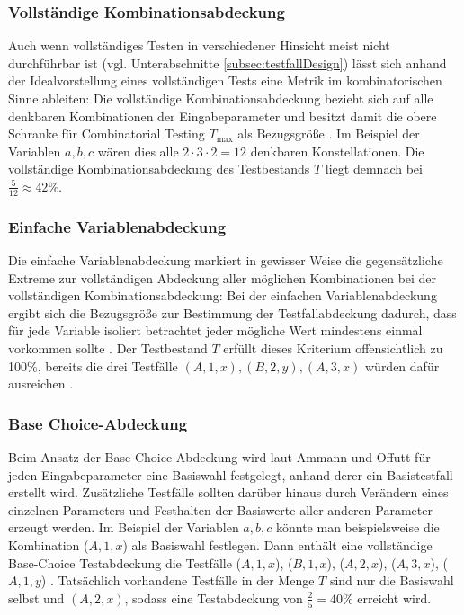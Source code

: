 \subsubsection{Vollständige Kombinationsabdeckung}\label{subsub:VollständigeAbdeckung}

Auch wenn vollständiges Testen in verschiedener Hinsicht meist nicht durchführbar ist (vgl. Unterabschnitte \ref{subsec:testfallDesign}) lässt sich anhand der Idealvorstellung eines vollständigen Tests eine Metrik im kombinatorischen Sinne ableiten: Die vollständige Kombinationsabdeckung bezieht sich auf alle denkbaren Kombinationen der Eingabeparameter und besitzt damit die obere Schranke für Combinatorial Testing $T_{\max}$ als Bezugsgröße \cite[S. 160]{ammann2008introduction}. Im Beispiel der Variablen $a, b, c$ wären dies alle $2 \cdot 3 \cdot 2 = 12$ denkbaren Konstellationen. Die vollständige Kombinationsabdeckung des Testbestands $T$ liegt demnach bei $\frac{5}{12} \approx 42 \%$.

\subsubsection{Einfache Variablenabdeckung}

Die einfache Variablenabdeckung markiert in gewisser Weise die gegensätzliche Extreme zur vollständigen Abdeckung aller möglichen Kombinationen bei der vollständigen Kombinationsabdeckung: Bei der einfachen Variablenabdeckung ergibt sich die Bezugsgröße zur Bestimmung der Testfallabdeckung dadurch, dass für jede Variable isoliert betrachtet jeder mögliche Wert mindestens einmal vorkommen sollte \cite[S. 160 f.]{ammann2008introduction}. Der Testbestand $T$ erfüllt dieses Kriterium offensichtlich zu 100\%, bereits die drei Testfälle $(A, 1, x), (B, 2, y), (A, 3, x)$ würden dafür ausreichen \cite[S. 160 f.]{ammann2008introduction}. 

\subsubsection{Base Choice-Abdeckung}\label{subsub:BaseChoice}

Beim Ansatz der Base-Choice-Abdeckung wird laut Ammann und Offutt \cite[S. 162]{ammann2008introduction} für jeden Eingabeparameter eine Basiswahl festgelegt, anhand derer ein Basistestfall erstellt wird. Zusätzliche Testfälle sollten darüber hinaus durch Verändern eines einzelnen Parameters und Festhalten der Basiswerte aller anderen Parameter erzeugt werden. Im Beispiel der Variablen $a,b,c$ könnte man beispielsweise die Kombination ($A,1,x$) als Basiswahl festlegen. Dann enthält eine vollständige Base-Choice Testabdeckung die Testfälle ($A,1,x$), ($B,1,x$), ($A,2,x$), ($A,3,x$), ($A,1,y$) \cite[S. 162]{ammann2008introduction}. Tatsächlich vorhandene Testfälle in der Menge $T$ sind nur die Basiswahl selbst und $(A,2,x)$, sodass eine Testabdeckung von $\frac{2}{5} = 40 \%$ erreicht wird.

